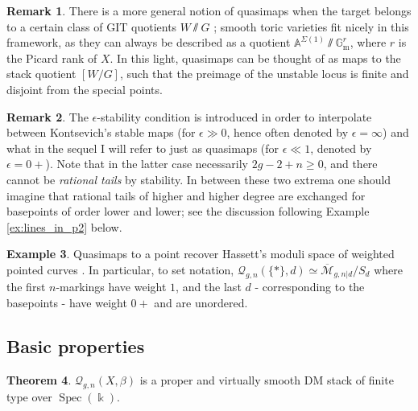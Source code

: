 \documentclass[11pt]{amsart}
\newcommand{\oM}{\overline{\mathcal{M}}}
\newcommand{\Q}[4]{\mathcal{Q}_{#1,#2}(#3,#4)}
\newcommand{\Aaff}{\mathbb{A}}
\newcommand{\kk}{\Bbbk}
\newcommand{\Spec}{\operatorname{Spec}}
\newcommand{\Gm}{\mathbb{G}_{\text{m}}}
\theoremstyle{definition}
\newtheorem{thm}{Theorem}[section]
\theoremstyle{definition}
\newtheorem{ex}[thm]{Example}
\newtheorem{rmk}[thm]{Remark}
\newcommand{\ilemph}[1]{\emph{#1}}
\begin{document}
\begin{rmk}
 There is a more general notion of quasimaps when the target belongs to a certain class of GIT quotients $W\sslash G$ \cite{CFKM}; smooth toric varieties fit nicely in this framework, as they can always be described as a quotient $\Aaff^{\Sigma(1)}\sslash\Gm^r$, where $r$ is the Picard rank of $X$. In this light, quasimaps can be thought of as maps to the stack quotient $[W/G]$, such that the preimage of the unstable locus is finite and disjoint from the special points.
\end{rmk}
\begin{rmk}
 The $\epsilon$-stability condition is introduced in order to interpolate between Kontsevich's stable maps (for $\epsilon\gg 0$, hence often denoted by $\epsilon=\infty$) and what in the sequel I will refer to just as quasimaps (for $\epsilon\ll1$, denoted by $\epsilon=0+$). Note that in the latter case necessarily $2g-2+n \geq 0$, and there cannot be \ilemph{rational tails} by stability. In between these two extrema one should imagine that rational tails of higher and higher degree are exchanged for basepoints of order lower and lower; see the discussion following Example \ref{ex:lines_in_p2} below.
\end{rmk}

\begin{ex}
 Quasimaps to a point recover Hassett's moduli space of weighted pointed curves \cite{Hassett}. In particular, to set notation, $\Q{g}{n}{\{*\}}{d}\simeq \oM_{g,n|d}/S_d$ where the first $n$-markings have weight $1$, and the last $d$ - corresponding to the basepoints - have weight $0+$ and are unordered.
\end{ex}

\subsection{Basic properties}\begin{thm}\cite[Theorems 3.2.1 and 4.0.1]{CF-K}
 $\Q{g}{n}{X}{\beta}$ is a proper and virtually smooth DM stack of finite type over $\Spec(\kk)$.
\end{thm}
\end{document}
